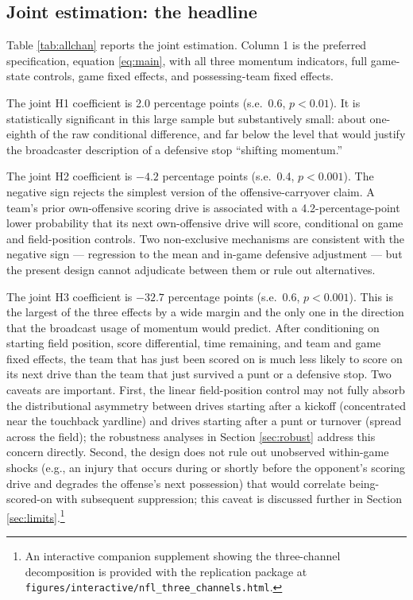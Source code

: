 \documentclass[11pt]{article}
\begin{document}
\subsection{Joint estimation: the headline}\label{sec:joint}

Table \ref{tab:allchan} reports the joint estimation. Column 1 is the
preferred specification, equation \eqref{eq:main}, with all three momentum
indicators, full game-state controls, game fixed effects, and possessing-team
fixed effects.



The joint H1 coefficient is 2.0 percentage points (s.e.\ 0.6, $p<0.01$). It
is statistically significant in this large sample but substantively small:
about one-eighth of the raw conditional difference, and far below the level
that would justify the broadcaster description of a defensive stop
``shifting momentum.''

The joint H2 coefficient is $-4.2$ percentage points (s.e.\ 0.4, $p<0.001$).
The negative sign rejects the simplest version of the offensive-carryover
claim. A team's prior own-offensive scoring drive is associated with a
4.2-percentage-point lower probability that its next own-offensive drive
will score, conditional on game and field-position controls. Two
non-exclusive mechanisms are consistent with the negative sign --- regression
to the mean and in-game defensive adjustment --- but the present design
cannot adjudicate between them or rule out alternatives.

The joint H3 coefficient is $-32.7$ percentage points (s.e.\ 0.6, $p<0.001$).
This is the largest of the three effects by a wide margin and the only one
in the direction that the broadcast usage of momentum would predict. After
conditioning on starting field position, score differential, time remaining,
and team and game fixed effects, the team that has just been scored on is
much less likely to score on its next drive than the team that just survived
a punt or a defensive stop. Two caveats are important. First, the linear
field-position control may not fully absorb the distributional asymmetry
between drives starting after a kickoff (concentrated near the touchback
yardline) and drives starting after a punt or turnover (spread across the
field); the robustness analyses in Section \ref{sec:robust} address this
concern directly. Second, the design does not rule out unobserved
within-game shocks (e.g., an injury that occurs during or shortly before the
opponent's scoring drive and degrades the offense's next possession) that
would correlate being-scored-on with subsequent suppression; this caveat is
discussed further in Section \ref{sec:limits}.\footnote{An interactive
companion supplement showing the three-channel decomposition is provided
with the replication package at \texttt{figures/interactive/nfl\_three\_channels.html}.}
\end{document}
